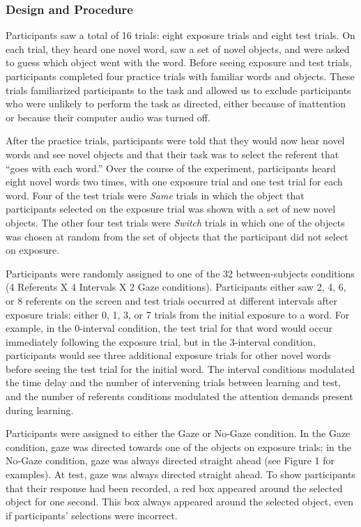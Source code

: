 \documentclass[authoryear, review]{elsarticle}
\begin{document}
\subsubsection{Design and Procedure}\label{design-and-procedure}

Participants saw a total of 16 trials: eight exposure trials and eight
test trials. On each trial, they heard one novel word, saw a set of
novel objects, and were asked to guess which object went with the word.
Before seeing exposure and test trials, participants completed four
practice trials with familiar words and objects. These trials
familiarized participants to the task and allowed us to exclude
participants who were unlikely to perform the task as directed, either
because of inattention or because their computer audio was turned off.

After the practice trials, participants were told that they would now
hear novel words and see novel objects and that their task was to select
the referent that ``goes with each word.'' Over the course of the
experiment, participants heard eight novel words two times, with one
exposure trial and one test trial for each word. Four of the test trials
were \emph{Same} trials in which the object that participants selected
on the exposure trial was shown with a set of new novel objects. The
other four test trials were \emph{Switch} trials in which one of the
objects was chosen at random from the set of objects that the
participant did not select on exposure.

Participants were randomly assigned to one of the 32 between-subjects
conditions (4 Referents X 4 Intervals X 2 Gaze conditions). Participants
either saw 2, 4, 6, or 8 referents on the screen and test trials
occurred at different intervals after exposure trials: either 0, 1, 3,
or 7 trials from the initial exposure to a word. For example, in the
0-interval condition, the test trial for that word would occur
immediately following the exposure trial, but in the 3-interval
condition, participants would see three additional exposure trials for
other novel words before seeing the test trial for the initial word. The
interval conditions modulated the time delay and the number of
intervening trials between learning and test, and the number of
referents conditions modulated the attention demands present during
learning.

Participants were assigned to either the Gaze or No-Gaze condition. In
the Gaze condition, gaze was directed towards one of the objects on
exposure trials; in the No-Gaze condition, gaze was always directed
straight ahead (see Figure 1 for examples). At test, gaze was always
directed straight ahead. To show participants that their response had
been recorded, a red box appeared around the selected object for one
second. This box always appeared around the selected object, even if
participants' selections were incorrect.
\end{document}
